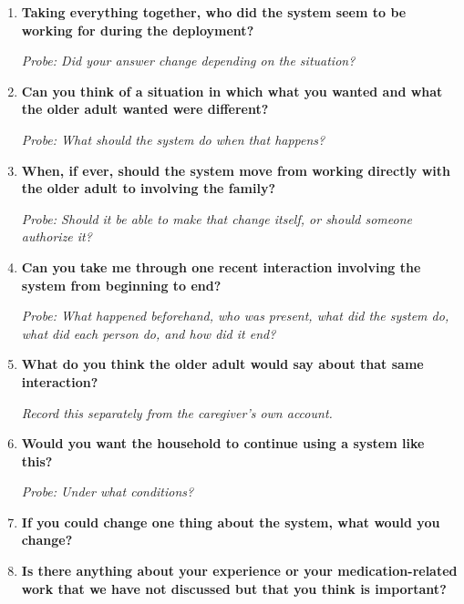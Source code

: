 \begin{enumerate}[resume]
  \item \textbf{Taking everything together, who did the system seem to be working for during the deployment?}

  \textit{Probe: Did your answer change depending on the situation?}
  \item \textbf{Can you think of a situation in which what you wanted and what the older adult wanted were different?}

  \textit{Probe: What should the system do when that happens?}
  \item \textbf{When, if ever, should the system move from working directly with the older adult to involving the family?}

  \textit{Probe: Should it be able to make that change itself, or should someone authorize it?}
  \item \textbf{Can you take me through one recent interaction involving the system from beginning to end?}

  \textit{Probe: What happened beforehand, who was present, what did the system do, what did each person do, and how did it end?}
  \item \textbf{What do you think the older adult would say about that same interaction?}

  \textit{Record this separately from the caregiver's own account.}
  \item \textbf{Would you want the household to continue using a system like this?}

  \textit{Probe: Under what conditions?}
  \item \textbf{If you could change one thing about the system, what would you change?}
  \item \textbf{Is there anything about your experience or your medication-related work that we have not discussed but that you think is important?}
\end{enumerate}
